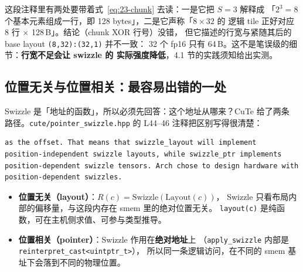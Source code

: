 这段注释里有两处要带着式~\eqref{eq:23-chunk} 去读：一是它把 $S=3$ 解释成
「$2^3=8$ 个基本元素组成一行，即 128 bytes」，二是它声称「$8\times32$ 的
逻辑 tile 正好对应 8 行 $\times$ 128\,B」。结论（chunk XOR 行号）没错，
但它描述的行宽与紧随其后的 base layout \texttt{\allowbreak{}(8,\allowbreak{}32):\allowbreak{}(32,\allowbreak{}1)} 并不一致：
32 个 fp16 只有 64\,B。这不是笔误级的细节：\textbf{行宽不足会让 swizzle 的
实际强度降低}，4.1 节的实践须知给出实测。

\subsection{位置无关与位置相关：最容易出错的一处}

Swizzle 是「地址的函数」，所以必须先回答：这个地址从哪来？CuTe 给了两条
路径。\texttt{cute/\allowbreak{}pointer\_\allowbreak{}swizzle.\allowbreak{}hpp} 的 L44--46 注释把区别写得很清楚：

\begin{lstlisting}[style=console]
as the offset. That means that swizzle_layout will implement
position-independent swizzle layouts, while swizzle_ptr implements
position-dependent swizzle tensors. Arch chose to design hardware with
position-dependent swizzles.
\end{lstlisting}

\begin{itemize}[leftmargin=2em]
\item \textbf{位置无关（layout）}：$R(c)=\text{Swizzle}(\text{Layout}(c))$，
Swizzle 只看布局内部的偏移量，与这段内存在 smem 里的绝对位置无关。
\texttt{layout(c)} 是纯函数，可在主机侧求值、可参与类型推导。
\item \textbf{位置相关（pointer）}：Swizzle 作用在\textbf{绝对地址}上
（\texttt{apply\_\allowbreak{}swizzle} 内部是 \texttt{reinterpret\_\allowbreak{}cast\allowbreak{}<uintptr\_\allowbreak{}t>}），
所以同一条逻辑访问，在不同的 smem 基址下会落到不同的物理位置。
\end{itemize}

